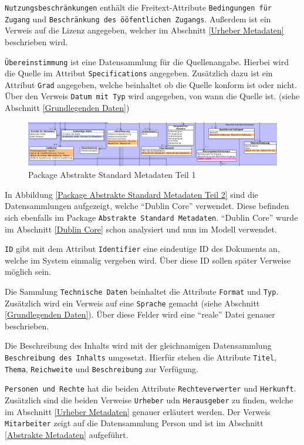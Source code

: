 \texttt{Nutzungsbeschr\"ankungen} enth\"alt die Freitext-Attribute \texttt{Bedingungen f\"ur Zugang} und \texttt{Beschr\"ankung des \"o\"ofentlichen Zugangs}. Au\ss{}erdem ist ein Verweis auf die Lizenz angegeben, welcher im Abschnitt \ref{Urheber Metadaten} beschrieben wird.

\texttt{\"Ubereinstimmung} ist eine Datensammlung f\"ur die Quellenangabe. Hierbei wird die Quelle im Attribut \texttt{Specifications} angegeben. Zus\"atzlich dazu ist ein Attribut \texttt{Grad} angegeben, welche beinhaltet ob die Quelle konform ist oder nicht. \"Uber den Verweis \texttt{Datum mit Typ} wird angegeben, von wann die Quelle ist. (siehe Abschnitt \ref{Grundlegenden Daten})

\begin{figure}[!ht]
\centering
\includegraphics[width=16cm]{Bilder/Datenmodell/Package-Abstrakte-Metadaten-Teil1.jpg}
\caption{Package Abstrakte Standard Metadaten Teil 1}
\label{Package Abstrakte Standard Metadaten Teil 1}
\centering
\end{figure}

In Abbildung \ref{Package Abstrakte Standard Metadaten Teil 2} sind die Datensammlungen aufgezeigt, welche "`Dublin Core"' verwendet. Diese befinden sich ebenfalls im Package \texttt{Abstrakte Standard Metadaten}. "`Dublin Core"' wurde im Abschnitt \ref{Dublin Core} schon analysiert und nun im Modell verwendet.

\texttt{ID} gibt mit dem Attribut \texttt{Identifier} eine eindeutige ID des Dokuments an, welche im System einmalig vergeben wird. \"Uber diese ID sollen sp\"ater Verweise m\"oglich sein.

Die Sammlung \texttt{Technische Daten} beinhaltet die Attribute \texttt{Format} und \texttt{Typ}. Zus\"atzlich wird ein Verweis auf eine \texttt{Sprache} gemacht (siehe Abschnitt \ref{Grundlegenden Daten}). \"Uber diese Felder wird eine "`reale"' Datei genauer beschrieben.

Die Beschreibung des Inhalts wird mit der gleichnamigen Datensammlung \texttt{Beschreibung des Inhalts} umgesetzt. Hierf\"ur stehen die Attribute \texttt{Titel}, \texttt{Thema}, \texttt{Reichweite} und \texttt{Beschreibung} zur Verf\"ugung.

\texttt{Personen und Rechte} hat die beiden Attribute \texttt{Rechteverwerter} und \texttt{Herkunft}. Zus\"atzlich sind die beiden Verweise \texttt{Urheber} udn \texttt{Herausgeber} zu finden, welche im Abschnitt \ref{Urheber Metadaten} genauer erl\"autert werden. Der Verweis \texttt{Mitarbeiter} zeigt auf die Datensammlung Person und ist im Abschnitt \ref{Abstrakte Metadaten} aufgef\"uhrt.

